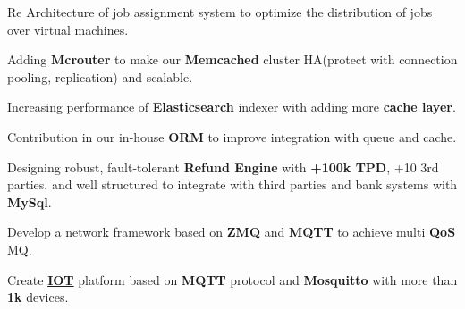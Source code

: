 \documentclass[]{plushcv}
\begin{document}
\begin{minipage}[t]{0.70\textwidth}
\begin{tightemize}
\end{tightemize}

\vspace{5pt} %

\begin{tightemize}
\item Re Architecture of job assignment system to optimize the distribution of jobs over virtual machines.
\item Adding \textbf{Mcrouter} to make our \textbf{Memcached} cluster HA(protect with connection pooling, replication) and scalable.
\item Increasing performance of \textbf{Elasticsearch} indexer with adding more \textbf{cache layer}.
\item Contribution in our in-house \textbf{ORM} to improve integration with queue and cache.
\end{tightemize}

\vspace{5pt} %
\begin{tightemize}
\item Designing robust, fault-tolerant \textbf{Refund Engine} with \textbf{+100k TPD}, +10 3rd parties, and well structured to integrate with third parties and bank systems with \textbf{MySql}.

\end{tightemize}
\sectionsep

\vspace{2pt}
\begin{tightemize}

\item Develop a network framework based on \textbf{ZMQ} and \textbf{MQTT} to achieve multi \textbf{QoS} MQ.
\end{tightemize}
\sectionsep
{}
\begin{tightemize}
\item Create \href{https://en.wikipedia.org/wiki/Internet_of_things}{\textbf{IOT}} platform based on \textbf{MQTT} protocol and \textbf{Mosquitto} with more than \textbf{1k} devices.
\end{tightemize}



\end{minipage}
\end{document}
